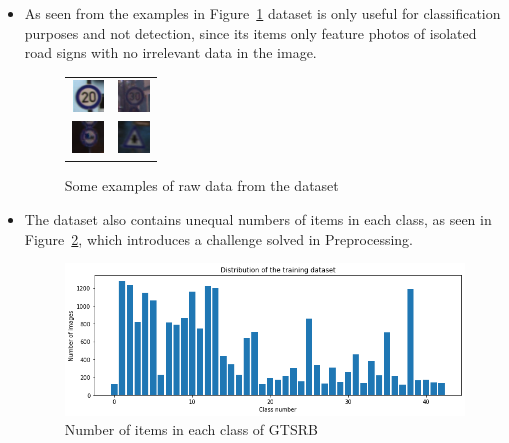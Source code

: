 \documentclass[12pt, landscape]{article}
\begin{document}
\begin{multicols}{3}
\begin{itemize}
    \item As seen from the examples in Figure~\ref{fig:dataset1examples} dataset
    is only useful for classification purposes and not detection, since its
    items only feature photos of isolated road signs with no irrelevant data in
    the image.
    \begin{figure}[H]
        \centering
        \begin{tabular}{cc}
        \includegraphics[scale=1.3]{ex1.png}&\includegraphics[scale=1.3]{ex2.png}\\
        \includegraphics[scale=1.3]{ex3.png}&\includegraphics[scale=1.3]{ex4.png}\\
        \end{tabular}
        \caption{Some examples of raw data from the dataset}
        \label{fig:dataset1examples}
    \end{figure}

    \item The dataset also contains unequal numbers of items in each class, as
    seen in Figure~\ref{fig:dataset1balance}, which introduces a challenge solved in
    Preprocessing.
    \begin{figure}[H]
        \centerline{\includegraphics[scale = 0.5]{download.png}}
        \caption{Number of items in each class of GTSRB}
        \label{fig:dataset1balance}
    \end{figure}


\end{itemize}
\end{multicols}
\end{document}
